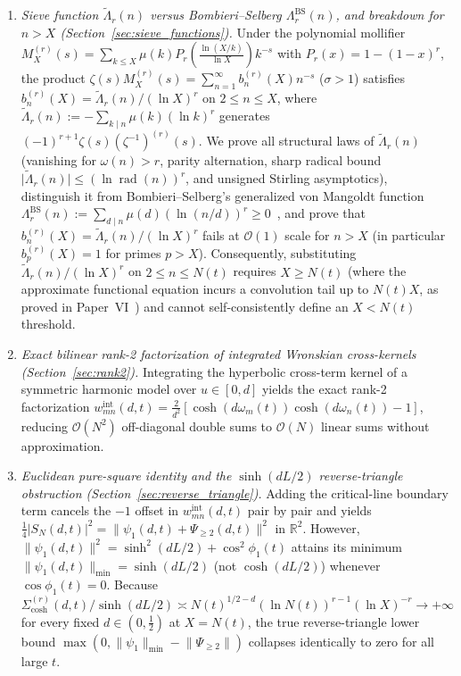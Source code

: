 \documentclass[11pt,reqno]{amsart}
\theoremstyle{definition}
\theoremstyle{remark}
\numberwithin{equation}{section}
\newcommand{\R}{\mathbb{R}}
\DeclareMathOperator{\rad}{rad}
\begin{document}
\begin{enumerate}[label=\textup{(\arabic*)},leftmargin=2.2em]
\item {\sloppy\textit{Sieve function $\widetilde{\Lambda}_r(n)$ versus Bombieri--Selberg $\Lambda_r^{\mathrm{BS}}(n)$, and breakdown for $n > X$ (Section~\ref{sec:sieve_functions}).} Under the polynomial mollifier $M_X^{(r)}(s) =\allowbreak \sum_{k \le X}\mu(k)P_r(\frac{\ln(X/k)}{\ln X})k^{-s}$ with $P_r(x) = 1 - (1-x)^r$, the product $\zeta(s)M_X^{(r)}(s) =\allowbreak \sum_{n=1}^{\infty} b_n^{(r)}(X)n^{-s}$ ($\sigma > 1$) satisfies $b_n^{(r)}(X) = \widetilde{\Lambda}_r(n)/(\ln X)^r$ on $2 \le n \le X$, where $\widetilde{\Lambda}_r(n) :=\allowbreak -\sum_{k \mid n}\mu(k)(\ln k)^r$ generates $(-1)^{r+1}\zeta(s)(\zeta^{-1})^{(r)}(s)$. We prove all structural laws of $\widetilde{\Lambda}_r(n)$ (vanishing for $\omega(n) > r$, parity alternation, sharp radical bound $\lvert\widetilde{\Lambda}_r(n)\rvert \le (\ln\rad(n))^r$, and unsigned Stirling asymptotics), distinguish it from Bombieri--Selberg's generalized von Mangoldt function $\Lambda_r^{\mathrm{BS}}(n) :=\allowbreak \sum_{d \mid n}\mu(d)(\ln(n/d))^r \ge 0$~\cite{bombieri1976,iwanieckowalski2004}, and prove that $b_n^{(r)}(X) =\allowbreak \widetilde{\Lambda}_r(n)/(\ln X)^r$ fails at $\mathcal{O}(1)$ scale for $n > X$ (in particular $b_p^{(r)}(X) = 1$ for primes $p > X$). Consequently, substituting $\widetilde{\Lambda}_r(n)/(\ln X)^r$ on $2 \le n \le N(t)$ requires $X \ge N(t)$ (where the approximate functional equation incurs a convolution tail up to $N(t)X$, as proved in Paper~VI~\cite{missiaen2026p6}) and cannot self-consistently define an $X < N(t)$ threshold.\par}
\item \textit{Exact bilinear rank-2 factorization of integrated Wronskian cross-kernels (Section~\ref{sec:rank2}).} Integrating the hyperbolic cross-term kernel of a symmetric harmonic model over $u \in [0, d]$ yields the exact rank-2 factorization $w_{mn}^{\mathrm{int}}(d,t) = \frac{2}{d^2}[\cosh(d\omega_m(t))\cosh(d\omega_n(t)) - 1]$, reducing $\mathcal{O}(N^2)$ off-diagonal double sums to $\mathcal{O}(N)$ linear sums without approximation.
\item \textit{Euclidean pure-square identity and the $\sinh(dL/2)$ reverse-triangle obstruction (Section~\ref{sec:reverse_triangle}).} Adding the critical-line boundary term cancels the $-1$ offset in $w_{mn}^{\mathrm{int}}(d,t)$ pair by pair and yields $\frac{1}{4}\lvert S_N(d,t)\rvert^2 = \lVert\psi_1(d,t) + \Psi_{\ge 2}(d,t)\rVert^2$ in $\R^2$. However, $\lVert\psi_1(d,t)\rVert^2 = \sinh^2(dL/2) + \cos^2\phi_1(t)$ attains its minimum $\lVert\psi_1(d,t)\rVert_{\min} = \sinh(dL/2)$ (not $\cosh(dL/2)$) whenever $\cos\phi_1(t) = 0$. Because $\Sigma_{\cosh}^{(r)}(d,t)/\sinh(dL/2) \asymp N(t)^{1/2-d}(\ln N(t))^{r-1}(\ln X)^{-r} \to +\infty$ for every fixed $d \in (0, \frac{1}{2})$ at $X = N(t)$, the true reverse-triangle lower bound $\max(0, \lVert\psi_1\rVert_{\min} - \lVert\Psi_{\ge 2}\rVert)$ collapses identically to zero for all large $t$.

\end{enumerate}
\end{document}
